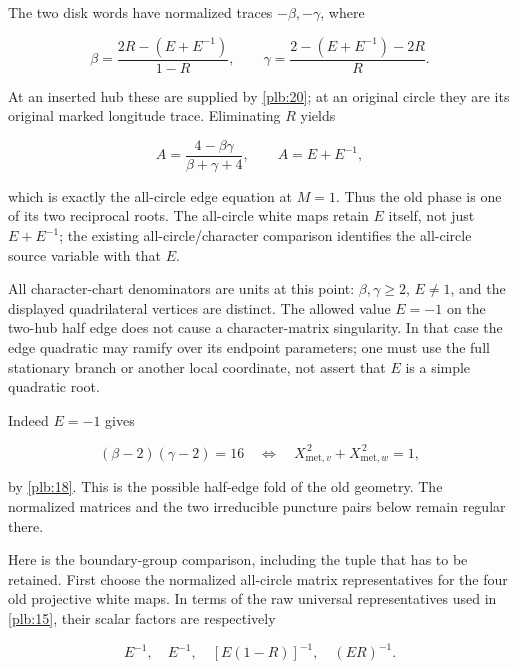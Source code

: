 The two disk words have normalized traces \(-\beta,-\gamma\), where

\begin{equation}\label{plb:21}
\beta=\frac{2R-(E+E^{-1})}{1-R},\qquad
 \gamma=\frac{2-(E+E^{-1})-2R}{R}.
\end{equation}

At an inserted hub these are supplied by \eqref{plb:20}; at an original circle they are its original marked longitude trace. Eliminating \(R\) yields

\begin{equation}\label{plb:22}
A=\frac{4-\beta\gamma}{\beta+\gamma+4},
 \qquad A=E+E^{-1},
\end{equation}

which is exactly the all-circle edge equation at \(M=1\). Thus the old phase is one of its two reciprocal roots. The all-circle white maps retain \(E\) itself, not just \(E+E^{-1}\); the existing all-circle/character comparison identifies the all-circle source variable with that \(E\).

All character-chart denominators are units at this point: \(\beta,\gamma\ge2\), \(E\ne1\), and the displayed quadrilateral vertices are distinct. The allowed value \(E=-1\) on the two-hub half edge does not cause a character-matrix singularity. In that case the edge quadratic may ramify over its endpoint parameters; one must use the full stationary branch or another local coordinate, not assert that \(E\) is a simple quadratic root.

Indeed \(E=-1\) gives

\begin{equation}\label{plb:22e}
(\beta-2)(\gamma-2)=16
 \quad\Longleftrightarrow\quad
 X_{\mathrm{met},v}^{\,2}+X_{\mathrm{met},w}^{\,2}=1,
\end{equation}

by \eqref{plb:18}. This is the possible half-edge fold of the old geometry.
The normalized matrices and the two irreducible puncture pairs
below remain regular there.

Here is the boundary-group comparison, including the tuple that has to be retained. First choose the normalized all-circle matrix representatives for the four old projective white maps. In terms of the raw universal representatives used in \eqref{plb:15}, their scalar factors are respectively

\begin{equation}\label{plb:22d}
E^{-1},\quad E^{-1},\quad
                [E(1-R)]^{-1},\quad (ER)^{-1}.
\end{equation}

